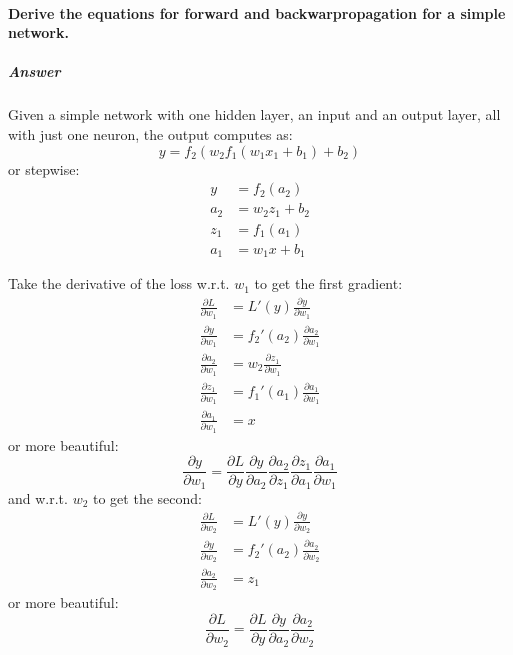 \documentclass[a4paper, 11pt, accentcolor = tud3b]{tudreport}
\newcommand{\answer}[1]{\subparagraph{Answer} #1}
\begin{document}
			\paragraph{Derive the equations for forward and backwarpropagation for a simple network.}
			\answer{
				Given a simple network with one hidden layer, an input and an output layer, all with just one neuron, the output computes as:
				\begin{equation}
					y = f_2(w_2 f_1(w_1 x_1 + b_1) + b_2)
				\end{equation}
				or stepwise:
				\begin{align}
					y &= f_2(a_2) \\
					a_2 &= w_2 z_1 + b_2 \\
					z_1 &= f_1(a_1) \\
					a_1 &= w_1 x + b_1
				\end{align}
				
				Take the derivative of the loss w.r.t. \(w_1\) to get the first gradient:
				\begin{align}
					\frac{\partial L}{\partial w_1} &= L'(y) \frac{\partial y}{\partial w_1} \\
					\frac{\partial y}{\partial w_1} &= f_2'(a_2) \frac{\partial a_2}{\partial w_1} \\
					\frac{\partial a_2}{\partial w_1} &= w_2 \frac{\partial z_1}{\partial w_1} \\
					\frac{\partial z_1}{\partial w_1} &= f_1'(a_1) \frac{\partial a_1}{\partial w_1} \\
					\frac{\partial a_1}{\partial w_1} &= x
				\end{align}
				or more beautiful:
				\begin{equation}
					\frac{\partial y}{\partial w_1} = \frac{\partial L}{\partial y} \frac{\partial y}{\partial a_2} \frac{\partial a_2}{\partial z_1} \frac{\partial z_1}{\partial a_1} \frac{\partial a_1}{\partial w_1}
				\end{equation}
				and w.r.t. \(w_2\) to get the second:
				\begin{align}
					\frac{\partial L}{\partial w_2} &= L'(y) \frac{\partial y}{\partial w_2} \\
					\frac{\partial y}{\partial w_2} &= f_2'(a_2) \frac{\partial a_2}{\partial w_2} \\
					\frac{\partial a_2}{\partial w_2} &= z_1
				\end{align}
				or more beautiful:
				\begin{equation}
					\frac{\partial L}{\partial w_2} = \frac{\partial L}{\partial y} \frac{\partial y}{\partial a_2} \frac{\partial a_2}{\partial w_2}
				\end{equation}
			}
\end{document}
